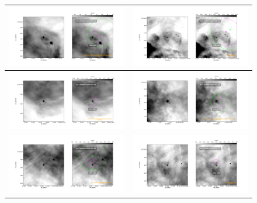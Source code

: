 \begin{figure}[htp]
\begin{tabular}{|l|l|}
    \includegraphics[width=0.47\linewidth, trim=60 50 100 50, clip]{j8oc01010_wcs/106-245-Bally_01-images.pdf}
   &\includegraphics[width=0.47\linewidth, trim=60 50 100 50, clip]{j8oc01010_wcs/109-246-Bally_01-images.pdf}\\  \hline
   \includegraphics[width=0.47\linewidth, trim=60 50 100 50, clip]{j8oc01010_wcs/117-421-Bally_01-images.pdf}
   &\includegraphics[width=0.47\linewidth, trim=60 50 100 50, clip]{j8oc01010_wcs/121-434-Bally_01-images.pdf}\\ \hline
   \includegraphics[width=0.47\linewidth, trim=60 50 100 50, clip]{j8oc01010_wcs/154-225-Bally_01-images.pdf}
   &\includegraphics[width=0.47\linewidth, trim=60 50 100 50, clip]{j8oc01010_wcs/154-240-Bally_01-images.pdf}\\ \hline
\end{tabular}
\end{figure}

